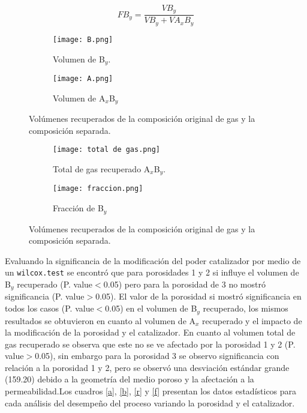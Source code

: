 \documentclass{article}
\begin{document}
\begin{equation}
    FB_y= \frac{VB_{y}}{VB_{y} +VA_{x}B_{y} }
\end{equation}


\begin{figure}
\centering
     \begin{subfigure}[]{1\linewidth}
         \texttt{[image: B.png]}
         \caption{Volumen de B$_y$.}
     \end{subfigure}
     \begin{subfigure}[]{1\linewidth}
         \texttt{[image: A.png]}
         \caption{Volumen de A$_x$B$_y$}
       \end{subfigure} 
     \caption{Volúmenes recuperados de la composición original de gas y la composición separada.}
        \label{AB}
\end{figure}
\begin{figure}
\centering
     \begin{subfigure}[]{1\linewidth}
         \texttt{[image: total de gas.png]}
         \caption{Total de gas recuperado A$_x$B$_y$.}
         \label{total1}
     \end{subfigure}
     \begin{subfigure}[]{1\linewidth}
         \texttt{[image: fraccion.png]}
         \caption{Fracción de B$_y$}
          \label{total2}
       \end{subfigure} 
     \caption{Volúmenes recuperados de la composición original de gas y la composición separada.}
        \label{total}
\end{figure}
Evaluando la significancia de la modificación del poder catalizador por medio de un \texttt{wilcox.test}  se encontró que para porosidades 1 y 2 si influye el volumen de B$_y$ recuperado (P. value$<$0.05) pero para la porosidad de 3 no mostró significancia (P. value$>$0.05). El valor de la porosidad si mostró significancia en todos los casos (P. value$<$0.05) en el volumen de B$_y$ recuperado, los mismos resultados se obtuvieron en cuanto al volumen de A$_x$ recuperado y el impacto de la modificación de la porosidad y el catalizador. En cuanto al volumen total de gas recuperado se observa que este no se ve afectado por la porosidad 1 y 2 (P. value$>$0.05), sin embargo para la porosidad 3 se observo significancia con relación a la porosidad 1 y 2, pero se observó una desviación estándar grande (159.20) debido a la geometría del medio poroso y la afectación a la permeabilidad.Los cuadros \ref{a}, \ref{b}, \ref{r} y \ref{f} presentan los datos estadísticos para cada análisis del desempeño del proceso variando la porosidad y el catalizador.
\end{document}
